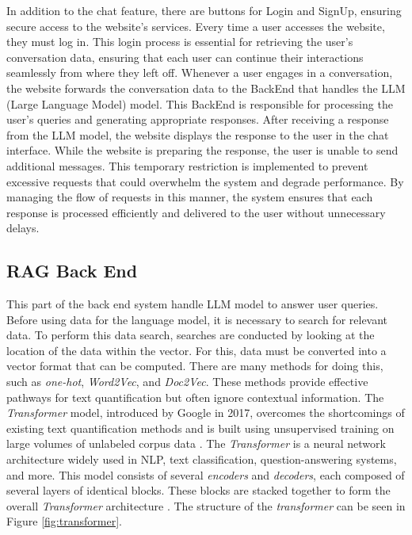 In addition to the chat feature, there are buttons for Login and SignUp, ensuring secure access to the website's services. Every time a user accesses the website, they must log in. This login process is essential for retrieving the user's conversation data, ensuring that each user can continue their interactions seamlessly from where they left off. Whenever a user engages in a conversation, the website forwards the conversation data to the BackEnd that handles the LLM (Large Language Model) model. This BackEnd is responsible for processing the user's queries and generating appropriate responses. After receiving a response from the LLM model, the website displays the response to the user in the chat interface. While the website is preparing the response, the user is unable to send additional messages. This temporary restriction is implemented to prevent excessive requests that could overwhelm the system and degrade performance. By managing the flow of requests in this manner, the system ensures that each response is processed efficiently and delivered to the user without unnecessary delays.


\subsection{RAG Back End}
\label{subsec:RAG}

This part of the back end system handle LLM model to answer user queries. Before using data for the language model, it is necessary to search for relevant data. To perform this data search, searches are conducted by looking at the location of the data within the vector. For this, data must be converted into a vector format that can be computed. There are many methods for doing this, such as \emph{one-hot}, \emph{Word2Vec}, and \emph{Doc2Vec}. These methods provide effective pathways for text quantification but often ignore contextual information. The \emph{Transformer} model, introduced by Google in 2017, overcomes the shortcomings of existing text quantification methods and is built using unsupervised training on large volumes of unlabeled corpus data \cite{vaswani2017attention}. The \emph{Transformer} is a neural network architecture widely used in NLP, text classification, question-answering systems, and more. This model consists of several \emph{encoders} and \emph{decoders}, each composed of several layers of identical blocks. These blocks are stacked together to form the overall \emph{Transformer} architecture \cite{miao2016processing}. The structure of the \emph{transformer} can be seen in Figure \ref*{fig:transformer}.

